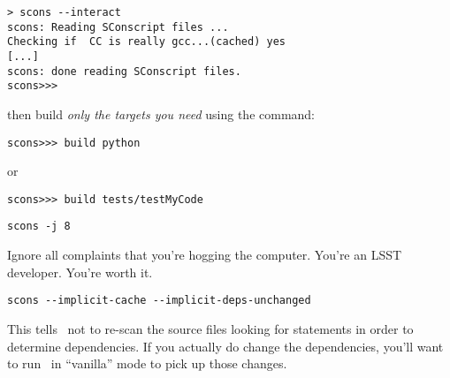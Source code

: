 
\begin{transcript}
\begin{verbatim}
> scons --interact
scons: Reading SConscript files ...
Checking if  CC is really gcc...(cached) yes
[...]
scons: done reading SConscript files.
scons>>>
\end{verbatim}
\end{transcript}

\noindent
then build \emph{only the targets you need} using the  command:

\begin{transcript}
\begin{verbatim}
scons>>> build python
\end{verbatim}
\end{transcript}

\noindent or

\begin{transcript}
\begin{verbatim}
scons>>> build tests/testMyCode
\end{verbatim}
\end{transcript}





\begin{transcript}
\begin{verbatim}
scons -j 8
\end{verbatim}
\end{transcript}

\noindent
Ignore all complaints that you're hogging the computer.  You're an
LSST developer.  You're worth it.






\begin{transcript}
\begin{verbatim}
scons --implicit-cache --implicit-deps-unchanged
\end{verbatim}
\end{transcript}

\noindent
This tells \scons\ not to re-scan the source files looking for
 statements in order to determine dependencies.  If you
actually do change the dependencies, you'll want to run \scons\ in
``vanilla'' mode to pick up those changes.


